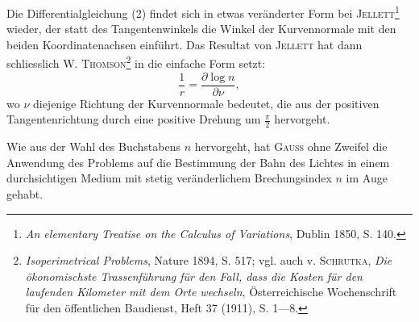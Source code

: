 \par\noindent\hspace*{\parindent}Die Differentialgleichung (2) findet sich in etwas veränderter Form bei
\textsc{Jellett}\footnote{\textit{An elementary Treatise on the Calculus of Variations}, Dublin 1850, S. 140.} wieder, der statt des Tangentenwinkels die Winkel der Kurvennormale mit den beiden Koordinatenachsen einführt. Das Resultat von \textsc{Jellett} hat dann schliesslich W. \textsc{Thomson}\footnote{\textit{Isoperimetrical Problems}, Nature 1894, S. 517; vgl. auch v. \textsc{Schrutka}, \textit{Die ökonomischste Trassenführung für den Fall, dass die Kosten für den laufenden Kilometer mit dem Orte wechseln}, Österreichische
Wochenschrift für den öffentlichen Baudienst, Heft 37 (1911), S. 1—8.} in die einfache Form setzt:
\[
\frac1r=\frac{\partial\log n}{\partial\nu},
\]
wo $\nu$ diejenige Richtung der Kurvennormale bedeutet, die aus der positiven
Tangentenrichtung durch eine positive Drehung um $\frac\pi2$ hervorgeht.
\par\noindent\hspace*{\parindent}Wie aus der Wahl des Buchstabens $n$ hervorgeht, hat \textsc{Gauss} ohne Zweifel
die Anwendung des Problems auf die Bestimmung der Bahn des Lichtes in
einem durchsichtigen Medium mit stetig veränderlichem Brechungsindex $n$ im
Auge gehabt.
\clearpage\endgroup
